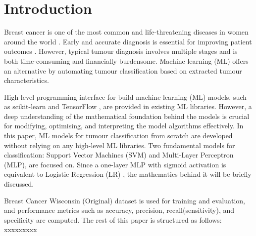 \section{Introduction}

Breast cancer is one of the most common and life-threatening diseases in women around the world \cite{WHO2024}.  Early and accurate diagnosis is essential for improving patient outcomes \cite{Sun2017}. However, typical tumour diagnosis involves multiple stages \cite{Cardoso2019} and is both time-comsuming and financially burdensome. Machine learning (ML) offers an alternative by automating tumour classification based on  extracted tumour characteristics. 

High-level programming interface for build machine learning (ML) models, such as scikit-learn \cite{scikit_learn} and TensorFlow \cite{TensorFlow2024}, are provided in existing ML libraries. However, a deep understanding of the mathematical foundation behind the models is crucial for modifying, optimising, and interpreting the model algorithms effectively. In this paper, ML models for tumour classification from scratch are developed without relying on any high-level ML libraries. Two fundamental models for classification: Support Vector Machines (SVM) and Multi-Layer Perceptron (MLP), are focused on. Since a one-layer MLP with sigmoid activation is equivalent to Logistic Regression (LR) \cite{Bishop2006}, the mathematics behind it will be briefly discussed.

Breast Cancer Wisconsin (Original) dataset is used for training and evaluation, and performance metrics such as accuracy, precision, recall(sensitivity), and specificity are computed. The rest of this paper is structured as follows: xxxxxxxxx